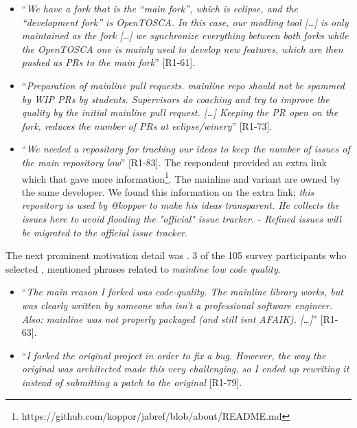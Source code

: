 \begin{itemize}[leftmargin=*]
\item ``\emph{We have a fork that is the ``main fork'', which is eclipse, and the ``development fork'' is OpenTOSCA. In this case, our modling tool [\ldots] is only maintained as the fork [\ldots] we synchronize everything between both forks while the OpenTOSCA one is mainly used to develop new features, which are then pushed as PRs to the main fork}'' [R1-61].

\item ``\emph{Preparation of mainline pull requests. mainline repo should not be spammed by WIP PRs by students. Supervisors do coaching and try to improve the quality by the initial mainline pull request. [\dots] Keeping the PR open on the fork, reduces the number of PRs at eclipse/winery}'' [R1-73].

\item ``\emph{We needed a repository for tracking our ideas to keep the number of issues of the main repository low}'' [R1-83]. The respondent provided an extra link which that gave more information\footnote{https://github.com/koppor/jabref/blob/about/README.md}. The mainline and variant are owned by the same developer. We found this information on the extra link; \emph{this repository is used by @koppor to make his ideas transparent. He collects the issues here to avoid flooding the "official" issue tracker. - Refined issues will be migrated to the official issue tracker}.
\end{itemize}

\nd The next prominent  motivation detail was .
3 of the 105 survey participants who selected , mentioned phrases related to \emph{mainline low code quality}.

\begin{itemize}[leftmargin=*]
\item ``\emph{The main reason I forked was code-quality. The mainline library works, but was clearly written by someone who isn't a professional software engineer. Also: mainline was not properly packaged (and still isnt AFAIK). [\ldots]}'' [R1-63].

\item ``\emph{I forked the original project in order to fix a bug. However, the way the original was architected made this very challenging, so I ended up rewriting it instead of submitting a patch to the original} [R1-79].
\end{itemize}



